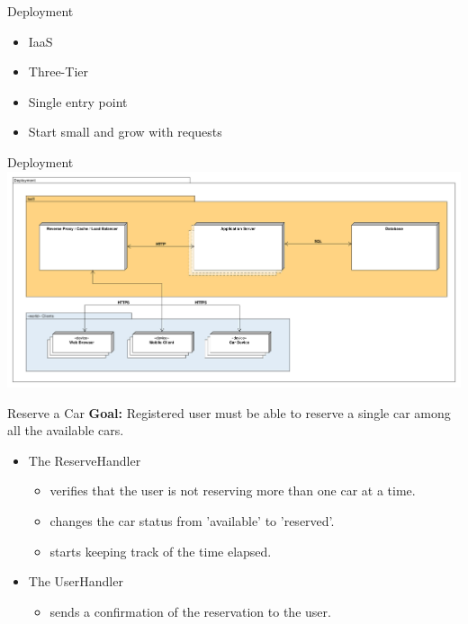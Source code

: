 \documentclass{beamer}
\begin{document}
\begin{frame}{Deployment}
    \begin{itemize}
        \item IaaS
        \item Three-Tier
        \item Single entry point
        \item Start small and grow with requests
    \end{itemize}
\end{frame}

\begin{frame}{Deployment}
    \includegraphics[width=\textwidth]{deployment}
\end{frame}

\begin{frame}{Reserve a Car}
    \textbf{Goal:} Registered user must be able to reserve a single car among
        all the available cars.
    \begin{itemize}
        \item The ReserveHandler
            \begin{itemize}
                \item verifies that the user is not reserving more than one car at a time.
                \item changes the car status from 'available' to 'reserved'.
                \item starts keeping track of the time elapsed.
            \end{itemize}
        \item The UserHandler
            \begin{itemize}
                \item sends a confirmation of the reservation to the user.
            \end{itemize}
    \end{itemize}
\end{frame}
\end{document}
